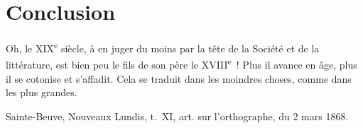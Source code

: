 \documentclass[french,twoside]{book} %
\newenvironment{quoteblock}%
  {\begin{quoting}}
  {\end{quoting}}
\newcommand\chapteropen{} %
\newcommand\chaptercont{} %
\newenvironment{quotebar}{%
    \def\FrameCommand{{\color{rubric!10!}\vrule width 0.5em} \hspace{0.9em}}%
    \def\OuterFrameSep{\itemsep} %
    \MakeFramed {\advance\hsize-\width \FrameRestore}
  }%
  {%
    \endMakeFramed
  }
\renewenvironment{quoteblock}%
  {%
    \savenotes
    \setstretch{0.9}
    \normalfont
    \begin{quotebar}
  }
  {%
    \end{quotebar}
    \spewnotes
  }
\begin{document}
\chapteropen
\chapter[{Conclusion}]{Conclusion}\renewcommand{\leftmark}{Conclusion}


\chaptercont

\begin{quoteblock}
 \noindent Oh, le XIX\textsuperscript{e} siècle, à en juger du moins par la tête de la Société et de la littérature, est bien peu le fils de son père le XVIII\textsuperscript{e} ! Plus il avance en âge, plus il se cotonise et s’affadit. Cela se traduit dans les moindres choses, comme dans les plus grandes.
 \par
\par
{\citbibl Sainte-Beuve, Nouveaux Lundis, t. XI, art. sur l’orthographe, du 2 mars 1868.}
\end{quoteblock}
\end{document}

